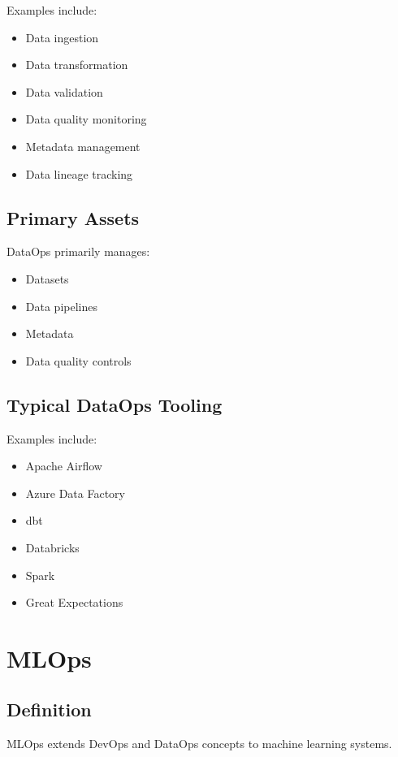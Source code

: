 Examples include:

\begin{itemize}
    \item Data ingestion
    \item Data transformation
    \item Data validation
    \item Data quality monitoring
    \item Metadata management
    \item Data lineage tracking
\end{itemize}

\subsection{Primary Assets}

DataOps primarily manages:

\begin{itemize}
    \item Datasets
    \item Data pipelines
    \item Metadata
    \item Data quality controls
\end{itemize}

\subsection{Typical DataOps Tooling}

Examples include:

\begin{itemize}
    \item Apache Airflow
    \item Azure Data Factory
    \item dbt
    \item Databricks
    \item Spark
    \item Great Expectations
\end{itemize}

\section{MLOps}

\subsection{Definition}

MLOps extends DevOps and DataOps concepts to machine learning systems.

